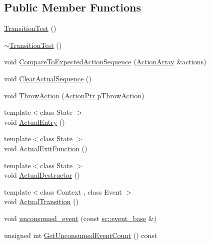 \subsection*{Public Member Functions}
\begin{DoxyCompactItemize}
\item 
\mbox{\hyperlink{struct_transition_test_afb3b0812fffeb0ecf9fd5de9f87e06ef}{Transition\+Test}} ()
\item 
\mbox{\hyperlink{struct_transition_test_a96b869f3eb379097b3178b5ed19478cc}{$\sim$\+Transition\+Test}} ()
\item 
void \mbox{\hyperlink{struct_transition_test_a7c6870a767b96b98129236a210a5ef46}{Compare\+To\+Expected\+Action\+Sequence}} (\mbox{\hyperlink{_transition_test_8cpp_a1d8ad65b218dadeb669673cad2ace650}{Action\+Array}} \&actions)
\item 
void \mbox{\hyperlink{struct_transition_test_a20530f674a63b2337ae22f939f02a5dc}{Clear\+Actual\+Sequence}} ()
\item 
void \mbox{\hyperlink{struct_transition_test_a75cec2df43a48dc581d59402eefd7fba}{Throw\+Action}} (\mbox{\hyperlink{_transition_test_8cpp_a15abe0c263cd39ad777035499160b924}{Action\+Ptr}} p\+Throw\+Action)
\item 
{\footnotesize template$<$class State $>$ }\\void \mbox{\hyperlink{struct_transition_test_acdaa9bae86b0d04bd600a1f15ddef321}{Actual\+Entry}} ()
\item 
{\footnotesize template$<$class State $>$ }\\void \mbox{\hyperlink{struct_transition_test_a274fb4369afe2847f7d1007b5d678382}{Actual\+Exit\+Function}} ()
\item 
{\footnotesize template$<$class State $>$ }\\void \mbox{\hyperlink{struct_transition_test_a3088a0f806fabd51691071dd45b00d7c}{Actual\+Destructor}} ()
\item 
{\footnotesize template$<$class Context , class Event $>$ }\\void \mbox{\hyperlink{struct_transition_test_a48a6fb92eaa75fcfdb1c4914ad322d03}{Actual\+Transition}} ()
\item 
void \mbox{\hyperlink{struct_transition_test_a571199fb1d7484cd8a9e575b9524e92f}{unconsumed\+\_\+event}} (const \mbox{\hyperlink{classboost_1_1statechart_1_1event__base}{sc\+::event\+\_\+base}} \&)
\item 
unsigned int \mbox{\hyperlink{struct_transition_test_ab8ad781cbebc6862d9032a11538d1f95}{Get\+Unconsumed\+Event\+Count}} () const
\end{DoxyCompactItemize}
